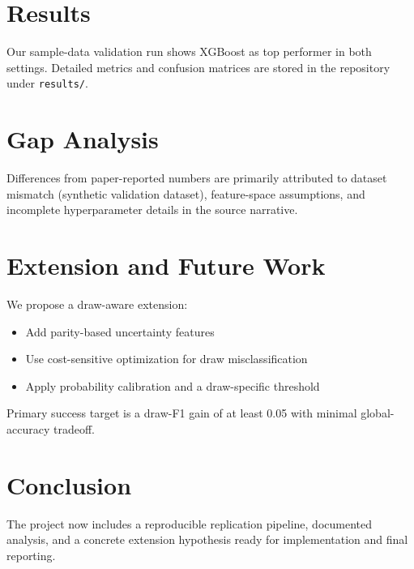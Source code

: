 \documentclass[11pt]{article}
\begin{document}
\section{Results}
Our sample-data validation run shows XGBoost as top performer in both settings. Detailed metrics and confusion matrices are stored in the repository under \texttt{results/}.

\section{Gap Analysis}
Differences from paper-reported numbers are primarily attributed to dataset mismatch (synthetic validation dataset), feature-space assumptions, and incomplete hyperparameter details in the source narrative.

\section{Extension and Future Work}
We propose a draw-aware extension:
\begin{itemize}
  \item Add parity-based uncertainty features
  \item Use cost-sensitive optimization for draw misclassification
  \item Apply probability calibration and a draw-specific threshold
\end{itemize}
Primary success target is a draw-F1 gain of at least 0.05 with minimal global-accuracy tradeoff.

\section{Conclusion}
The project now includes a reproducible replication pipeline, documented analysis, and a concrete extension hypothesis ready for implementation and final reporting.



\end{document}

